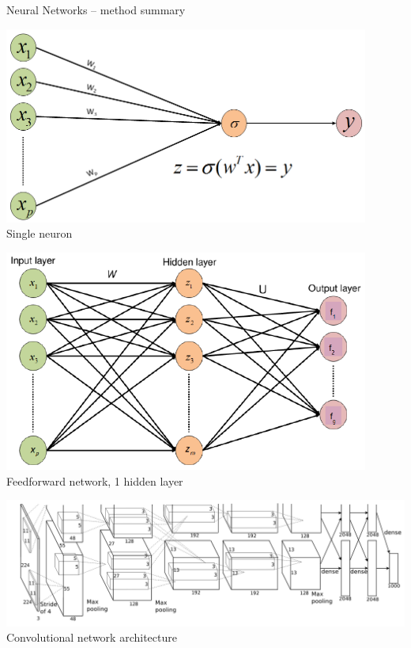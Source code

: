 \begin{frame}{Neural Networks -- method summary}
\begin{minipage}[b]{0.24\textwidth}
  \includegraphics[width=0.9\textwidth]{figure/nn-single-neuron} \\
  \tiny{Single neuron}
\end{minipage}%
\begin{minipage}[b]{0.24\textwidth}
  \includegraphics[width=0.9\textwidth]{figure/nn-feedforward} \\
  \tiny{Feedforward network, 1 hidden layer}
\end{minipage}%
\begin{minipage}[b]{0.5\textwidth}
  \includegraphics[width=\textwidth]{figure/nn-cnn-1} \\
  \tiny{Convolutional network architecture}
\end{minipage}

\end{frame}

